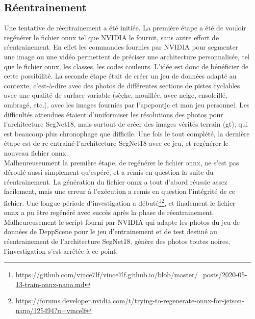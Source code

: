 \subsection{Réentrainement}
\noindent Une tentative de réentrainement a été initiée. La première étape a été de vouloir regénérer le fichier \acrshort{onnx} tel que NVIDIA le fournit, sans autre effort de réentrainement. En effet les commandes fournies par NVIDIA pour segmenter une image ou une vidéo permettent de préciser une architecture personnalisée, tel que le fichier \acrshort{onnx}, les classes, les codes couleurs. L'idée est donc de bénéficier de cette possibilité. La seconde étape était de créer un jeu de données adapté au contexte, c'est-à-dire avec des photos de différentes sections de pistes cyclables avec une qualité de surface variable (sèche, mouillée, avec neige, ensoleillé, ombragé, etc.), avec les images fournies par l'\acrshort{apcpontjc} et mon jeu personnel. Les difficultés attendues étaient d'uniformiser les résolutions des photos pour l'architecture SegNet18, mais surtout de créer des images vérités terrain (\acrshort{gt}), qui est beaucoup plus chronophage que difficile. Une fois le tout complété, la dernière étape est de re entrainé l'architecture SegNet18 avec ce jeu, et regénérer le nouveau fichier \acrshort{onnx}. 
\vspace{0.5\baselineskip}
\\
\noindent Malheureuseument la première étape, de regénérer le fichier \acrshort{onnx}, ne s'est pas déroulé aussi simplement qu'espéré, et a remis en question la suite du réentrainement. La génération du fichier \acrshort{onnx} a tout d'abord réussie assez facilement, mais une erreur à l'exécution a remis en question l'intégrité de ce fichier. Une longue période d'investigation a débuté\footnote{\url{https://github.com/vince7lf/vince7lf.github.io/blob/master/_posts/2020-05-13-train-onnx-nano.md}}\footnote{\url{https://forums.developer.nvidia.com/t/trying-to-regenerate-onnx-for-jetson-nano/125494?u=vincelf}}, et finalement le fichier \acrshort{onnx} a pu être regénéré avec succès après la phase de réentrainement. Malheureusement le script fourni par NVIDIA qui adapte les photos du jeu de données de DeppScene pour le jeu d'entrainement et de test destiné au réentrainement de l'architecture SegNet18, génère des photos toutes noires, l'investigation s'est arrêtée à ce point.
